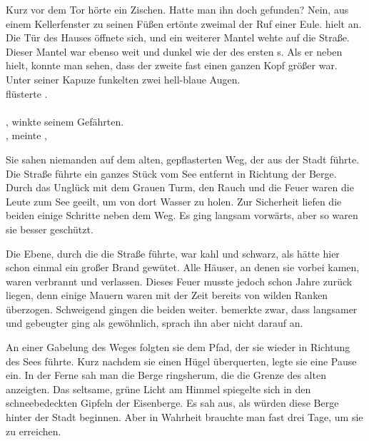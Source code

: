 \begin{Large}
Kurz vor dem Tor hörte {\Eno} ein Zischen. Hatte man ihn doch gefunden? Nein, aus einem Kellerfenster zu seinen Füßen ertönte zweimal der Ruf einer Eule. {\Eno} hielt an. Die Tür des Hauses öffnete sich, und ein weiterer Mantel wehte auf die Straße. Dieser Mantel war ebenso weit und dunkel wie der des ersten {\Schattenlaufer}s. Als er neben {\Eno} hielt, konnte man sehen, dass der zweite {\Schattenlaufer} fast einen ganzen Kopf größer war. Unter seiner Kapuze funkelten zwei hell-blaue Augen.\\
\q{{\Bomar}!} flüsterte {\Eno}. \\
\\
, {\Eno} winkte seinem Gefährten. \\
, meinte {\Bomar}, \\

Sie sahen niemanden auf dem alten, gepflasterten Weg, der aus der Stadt führte. Die Straße führte ein ganzes Stück vom See entfernt in Richtung der Berge. Durch das Unglück mit dem Grauen Turm, den Rauch und die Feuer waren die Leute zum See geeilt, um von dort Wasser zu holen. Zur Sicherheit liefen die beiden {\Schattenlaufer} einige Schritte neben dem Weg. Es ging langsam vorwärts, aber so waren sie besser geschützt.

Die Ebene, durch die die Straße führte, war kahl und schwarz, als hätte hier schon einmal ein großer Brand gewütet. Alle Häuser, an denen sie vorbei kamen, waren verbrannt und verlassen. Dieses Feuer musste jedoch schon Jahre zurück liegen, denn einige Mauern waren mit der Zeit bereits von wilden Ranken überzogen. Schweigend gingen die beiden {\Schattenlaufer} weiter. {\Bomar} bemerkte zwar, dass {\Eno} langsamer und gebeugter ging als gewöhnlich, sprach ihn aber nicht darauf an.

An einer Gabelung des Weges folgten sie dem Pfad, der sie wieder in Richtung des Sees führte. Kurz nachdem sie einen Hügel überquerten, legte sie eine Pause ein. In der Ferne sah man die Berge ringsherum, die die Grenze des alten  anzeigten. Das seltsame, grüne Licht am Himmel spiegelte sich in den schneebedeckten Gipfeln der Eisenberge. Es sah aus, als würden diese Berge hinter der Stadt {\Tern} beginnen. Aber in Wahrheit brauchte man fast drei Tage, um sie zu erreichen.


\end{Large}

